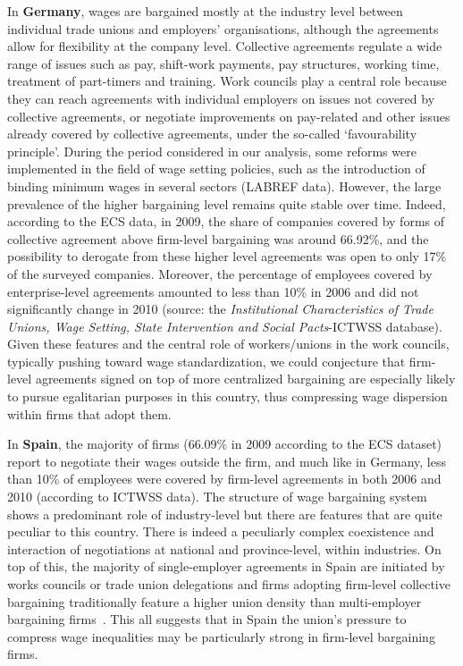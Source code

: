 \documentclass[12pt]{article}
\begin{document}
In \textbf{Germany}, wages are bargained mostly at the industry level between individual trade unions and employers' organisations, although the agreements allow for flexibility at the company level. Collective agreements regulate a wide range of issues such as pay, shift-work payments, pay structures, working time, treatment of part-timers and training. Work councils play a central role because they can reach agreements with individual employers on issues not covered by collective agreements, or negotiate improvements on pay-related and other issues already covered by collective agreements, under the so-called ‘favourability principle’.
During the period considered in our analysis, some reforms were implemented in the field of wage setting policies, such as the introduction of binding minimum wages in several sectors (LABREF data). However, the large prevalence of the higher bargaining level remains quite stable over time. Indeed, according to the ECS data, in 2009, the share of companies covered by forms of collective agreement above firm-level bargaining was around 66.92\%, and the possibility to derogate from these higher level agreements was open to only 17\% of the surveyed companies. Moreover, the percentage of employees covered by enterprise-level agreements amounted to less than 10\% in 2006 and did not significantly change in 2010 (source: the \textit{Institutional Characteristics of Trade Unions, Wage Setting, State Intervention and Social Pacts}-ICTWSS database). Given these features and the central role of workers/unions in the work councils, typically pushing toward wage standardization, we could conjecture that firm-level agreements signed on top of more centralized bargaining are especially likely to pursue egalitarian purposes in this country, thus compressing wage dispersion within firms that adopt them.

In \textbf{Spain}, the majority of firms (66.09\% in 2009 according to the ECS dataset) report to negotiate their wages outside the firm, and much like in Germany, less than 10\% of employees were covered by firm-level agreements in both 2006 and 2010 (according to ICTWSS data). The structure of wage bargaining system shows a predominant role of industry-level but there are features that are quite peculiar to this country. There is indeed a peculiarly complex coexistence and interaction of negotiations at national and province-level, within industries. On top of this, the majority of single-employer agreements in Spain are initiated by works
councils or trade union delegations and firms adopting firm-level collective bargaining traditionally feature a higher union density than multi-employer bargaining firms~\citep{plasman.rusinek.ea.2007}. This all suggests that in Spain the union's pressure to compress wage inequalities may be particularly strong in firm-level bargaining firms.
\end{document}
